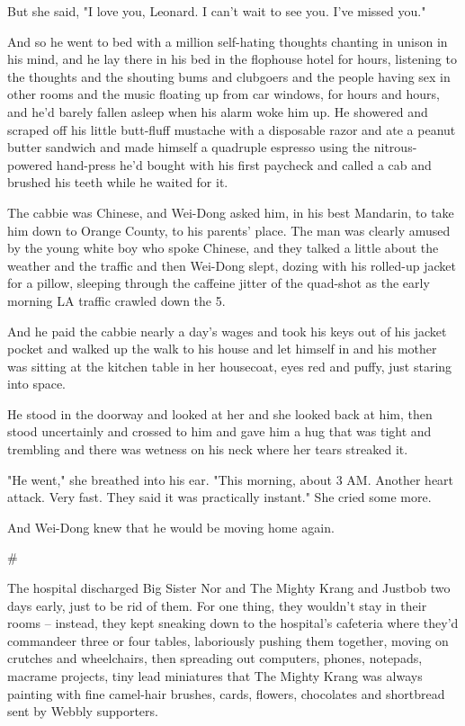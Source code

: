 But she said, "I love you, Leonard. I can't wait to see you. I've
missed you."

And so he went to bed with a million self-hating thoughts chanting
in unison in his mind, and he lay there in his bed in the flophouse
hotel for hours, listening to the thoughts and the shouting bums
and clubgoers and the people having sex in other rooms and the
music floating up from car windows, for hours and hours, and he'd
barely fallen asleep when his alarm woke him up. He showered and
scraped off his little butt-fluff mustache with a disposable razor
and ate a peanut butter sandwich and made himself a quadruple
espresso using the nitrous-powered hand-press he'd bought with his
first paycheck and called a cab and brushed his teeth while he
waited for it.

The cabbie was Chinese, and Wei-Dong asked him, in his best
Mandarin, to take him down to Orange County, to his parents' place.
The man was clearly amused by the young white boy who spoke
Chinese, and they talked a little about the weather and the traffic
and then Wei-Dong slept, dozing with his rolled-up jacket for a
pillow, sleeping through the caffeine jitter of the quad-shot as
the early morning LA traffic crawled down the 5.

And he paid the cabbie nearly a day's wages and took his keys out
of his jacket pocket and walked up the walk to his house and let
himself in and his mother was sitting at the kitchen table in her
housecoat, eyes red and puffy, just staring into space.

He stood in the doorway and looked at her and she looked back at
him, then stood uncertainly and crossed to him and gave him a hug
that was tight and trembling and there was wetness on his neck
where her tears streaked it.

"He went," she breathed into his ear. "This morning, about 3 AM.
Another heart attack. Very fast. They said it was practically
instant." She cried some more.

And Wei-Dong knew that he would be moving home again.

\#

The hospital discharged Big Sister Nor and The Mighty Krang and
Justbob two days early, just to be rid of them. For one thing, they
wouldn't stay in their rooms -- instead, they kept sneaking down to
the hospital's cafeteria where they'd commandeer three or four
tables, laboriously pushing them together, moving on crutches and
wheelchairs, then spreading out computers, phones, notepads,
macrame projects, tiny lead miniatures that The Mighty Krang was
always painting with fine camel-hair brushes, cards, flowers,
chocolates and shortbread sent by Webbly supporters.

